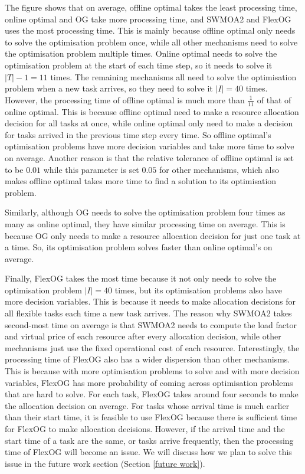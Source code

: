 \documentclass[11pt]{phdthesis}
\begin{document}
The figure shows that on average, offline optimal takes the least processing time, online optimal and OG take more processing time, and SWMOA2 and FlexOG uses the most processing time. This is mainly because offline optimal only needs to solve the optimisation problem once, while all other mechanisms need to solve the optimisation problem multiple times. Online optimal needs to solve the optimisation problem at the start of each time step, so it needs to solve it $ |T| - 1 = 11 $ times. The remaining mechanisms all need to solve the optimisation problem when a new task arrives, so they need to solve it $ |I| = 40 $ times. However, the processing time of offline optimal is much more than $ \frac{1}{11} $ of that of online optimal. This is because offline optimal need to make a resource allocation decision for all tasks at once, while online optimal only need to make a decision for tasks arrived in the previous time step every time. So offline optimal's optimisation problems have more decision variables and take more time to solve on average. Another reason is that the relative tolerance of offline optimal is set to be $ 0.01 $ while this parameter is set $ 0.05 $ for other mechanisms, which also makes offline optimal takes more time to find a solution to its optimisation problem.

Similarly, although OG needs to solve the optimisation problem four times as many as online optimal, they have similar processing time on average. This is because OG only needs to make a resource allocation decision for just one task at a time. So, its optimisation problem solves faster than online optimal's on average. 

Finally, FlexOG takes the most time because it not only needs to solve the optimisation problem $ |I| = 40 $ times, but its optimisation problems also have more decision variables. This is because it needs to make allocation decisions for all flexible tasks each time a new task arrives. The reason why SWMOA2 takes second-most time on average is that SWMOA2 needs to compute the load factor and virtual price of each resource after every allocation decision, while other mechanisms just use the fixed operational cost of each resource. Interestingly, the processing time of FlexOG also has a wider dispersion than other mechanisms. This is because with more optimisation problems to solve and with more decision variables, FlexOG has more probability of coming across optimisation problems that are hard to solve. For each task, FlexOG takes around four seconds to make the allocation decision on average. For tasks whose arrival time is much earlier than their start time, it is feasible to use FlexOG because there is sufficient time for FlexOG to make allocation decisions. However, if the arrival time and the start time of a task are the same, or tasks arrive frequently, then the processing time of FlexOG will become an issue. We will discuss how we plan to solve this issue in the future work section (Section \ref{future work}).
\end{document}
